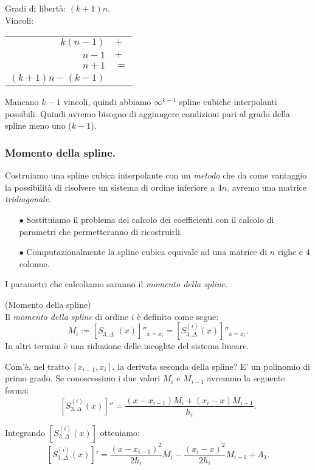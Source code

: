 \begin{flushleft}
Gradi di libertà: $(k+1)n$.\\
Vincoli:\\
\begin{tabular}{rl}
$k(n-1)$ &$+$\\
$ n-1$ &$+$\\
$ n+1 $&$=$\\
\hline 
$(k+1)n -(k-1)$
\end{tabular}
\end{flushleft}

Mancano $k-1$ vincoli, quindi abbiamo $\infty^{k-1}$ spline cubiche 
interpolanti possibili. Quindi avremo bisogno di aggiungere condizioni
pari al grado della spline meno uno ($k-1$).

\subsubsection*{Momento della spline.}
Costruiamo una spline cubica interpolante con un \emph{metodo} che da come
vantaggio la possibilità di risolvere un sistema di ordine inferiore a
$4n$. avremo una matrice \emph{tridiagonale}.
\begin{itemize}
\item[$\bullet$] Sostituiamo il problema del calcolo dei coefficienti con il
calcolo di parametri che permetteranno di ricostruirli.
\item[$\bullet$] Computazionalmente la spline cubica equivale ad una matrice
di $n$ righe e $4$ colonne.
\end{itemize}
I parametri che calcoliamo saranno il \emph{momento della spline}.
\begin{defi}(Momento della spline)\\
Il \emph{momento della spline} di ordine $i$ è definito come segue:
\[
M_i := \left[S_{3,\Delta}^{\phantom{(1)}}(x) \right]''_{x = x_i} = 
\left[S_{3,\Delta}^{(i)}(x) \right]''_{x = x_i}.
\]
In altri termini è una riduzione delle incoglite del sistema lineare.
\end{defi}

Com'è, nel tratto $[x_{i-1}, x_i]$, la derivata seconda della spline? E'
un polinomio di primo grado. Se conoscessimo i due valori $M_i$ e $M_{i-1}$
avremmo la seguente forma:
\[
\left[S_{3,\Delta}^{(i)}(x) \right]'' = 
\frac{(x-x_{i-1})M_i + (x_i-x)M_{i-1}}{h_i}.
\]

Integrando $[S_{3,\Delta}^{(i)}(x)]$ otteniamo:
\[
\left[S_{3,\Delta}^{(i)}(x) \right]' = \frac{(x-x_{i-1})^2}{2h_i}M_i 
- \frac{(x_i-x)^2}{2h_i}M_{i-1} + A_1.
\]

